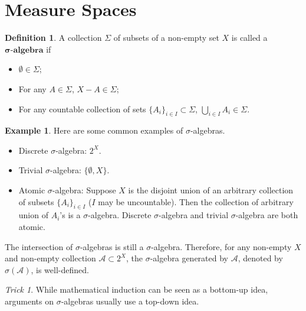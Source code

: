 \documentclass[openany]{book}
\theoremstyle{definition}
\newtheorem{definition}{Definition}[chapter]
\newtheorem{example}{Example}[chapter]
\theoremstyle{remark}
\newtheorem*{trick}{Trick}
\begin{document}
\section{Measure Spaces}
\begin{definition}
    A collection $\Sigma$ of subsets of a non-empty set $X$ is called a $\boldsymbol{\sigma}\textbf{-algebra}$ if
    \begin{itemize}
        \item $\emptyset\in\Sigma$;
        \item For any $A\in\Sigma$, $X-A\in\Sigma$;
        \item For any countable collection of sets $\{A_i\}_{i\in I}\subset\Sigma$, $\bigcup_{i\in I}A_i\in\Sigma$.
    \end{itemize}
\end{definition}
\begin{example}
    Here are some common examples of $\sigma$-algebras.
    \begin{itemize}
        \item Discrete $\sigma$-algebra: $2^X$.
        \item Trivial $\sigma$-algebra: $\{\emptyset,X\}$.
        \item Atomic $\sigma$-algebra: Suppose $X$ is the disjoint union of an arbitrary collection of subsets $\{A_i\}_{i\in I}$ ($I$ may be uncountable). Then the collection of arbitrary union of $A_i$'s is a $\sigma$-algebra. Discrete $\sigma$-algebra and trivial $\sigma$-algebra are both atomic.
    \end{itemize}
\end{example}
The intersection of $\sigma$-algebras is still a $\sigma$-algebra. Therefore, for any non-empty $X$ and non-empty collection $\mathcal{A}\subset 2^X$, the $\sigma$-algebra generated by $\mathcal{A}$, denoted by $\sigma(\mathcal{A})$, is well-defined.
\begin{trick}
    While mathematical induction can be seen as a bottom-up idea, arguments on $\sigma$-algebras usually use a top-down idea.
\end{trick}
\end{document}
